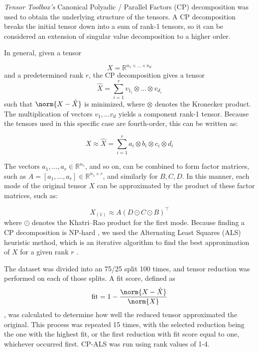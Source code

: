 \textit{Tensor Toolbox's} \cite{tensor_toolbox_gitlab} Canonical Polyadic / Parallel Factors (CP) decomposition \cite{kolda_tensors} was used to obtain the underlying structure of the tensors. A CP decomposition breaks the initial tensor down into a sum of rank-1 tensors, so it can be considered an extension of singular value decomposition to a higher order. 

In general, given a tensor

\begin{equation*}
    X = \mathbb{R}^{n_1 \times \dots \times n_d}
\end{equation*}
and a predetermined rank $r$, the CP decomposition gives a tensor
\begin{equation*}
    \hat{X} = \sum^{r}_{i=1} v_{1_{i}} \otimes \dots \otimes v_{d_{i}}
\end{equation*}
such that $\norm{X - \hat{X}}$ is minimized, where $\otimes$ denotes the Kronecker product. The multiplication of vectors $v_1, \dots v_d$ yields a component rank-1 tensor. Because the tensors used in this specific case are fourth-order, this can be written as:

\begin{equation*}
    X \approx \hat{X} = \sum^{r}_{i=1} a_i \otimes b_i \otimes c_i \otimes d_i
\end{equation*}

The vectors $a_1,\dots,a_r\in\mathbb{R}^{n_1}$, and so on, can be combined to form factor matrices, such as $A = [a_1, \dots, a_r]\in\mathbb{R}^{n_1\times r}$, and similarly for $B, C, D$. In this manner, each mode of the original tensor $X$ can be approximated by the product of these factor matrices, such as:

\begin{equation*}
    X_{(1)} \approx A \left( D \odot C \odot B \right)^{\top}
\end{equation*}
where $\odot$ denotes the Khatri--Rao product for the first mode. Because finding a CP decomposition is NP-hard \cite{hillar_most_2013}, we used the Alternating Least Squares (ALS) heuristic method, which is an iterative algorithm to find the best approximation of $X$ for a given rank $r$ \cite{kolda_tensors}.

The dataset was divided into an 75/25 split 100 times, and tensor reduction was performed on each of those splits. A fit score, defined as
\begin{equation*}
    \mathrm{fit} = 1 - \frac{\norm{X - \hat{X}}}{\norm{X}}
\end{equation*}
, was calculated to determine how well the reduced tensor approximated the original. This process was repeated 15 times, with the selected reduction being the one with the highest fit, or the first reduction with fit score equal to one, whichever occurred first. CP-ALS was run using rank values of 1-4.  

